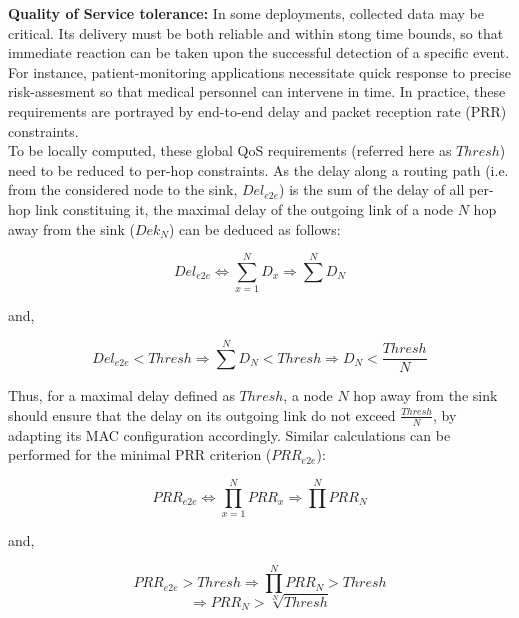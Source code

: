 \documentclass[12pt,journal,compsoc]{IEEEtran}
\begin{document}
\textbf{Quality of Service tolerance:} In some deployments, collected data may be critical. Its delivery must be both reliable and within stong time bounds, so that immediate reaction can be taken upon the successful detection of a specific event. For instance, patient-monitoring applications necessitate quick response to precise risk-assesment so that medical personnel can intervene in time. In practice, these requirements are portrayed by end-to-end delay and packet reception rate (PRR) constraints.\\
To be locally computed, these global QoS requirements (referred here as $Thresh$) need to be reduced to per-hop constraints. 
As the delay along a routing path (i.e. from the considered node to the sink, $Del_{e2e}$) is the sum of the delay of all per-hop link constituing it, the maximal delay of the outgoing link of a node $N$ hop away from the sink ($Dek_{N}$) can be deduced as follows:
\begin{small}
\[
Del_{e2e} \Leftrightarrow \sum_{x=1}^N D_{x} \Rightarrow \sum^N D_{N}
\]
\end{small}
and,
\begin{small}
\[
Del_{e2e} < Thresh \Rightarrow \sum^N D_{N} < Thresh \Rightarrow D_{N} < \frac{Thresh}{N}
\]
\end{small}
Thus, for a maximal delay defined as $Thresh$, a node $N$ hop away from the sink should ensure that the delay on its outgoing link do not exceed $\frac{Thresh}{N}$, by adapting its MAC configuration accordingly.
Similar calculations can be performed for the minimal PRR criterion ($PRR_{e2e}$): %
\begin{small}
\[
PRR_{e2e} \Leftrightarrow \prod_{x=1}^N PRR_{x} \Rightarrow \prod^N PRR_{N}
\]
\end{small}
and,
\begin{small}
\[
   PRR_{e2e} > Thresh \Rightarrow \prod^N PRR_{N} > Thresh
\]
\[
 \Rightarrow PRR_{N} > \sqrt[N]{Thresh}
\]
\end{small}


\end{document}
